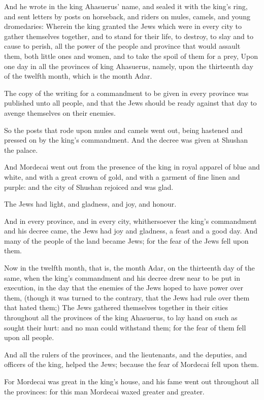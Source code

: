 \Verse And he wrote in the king Ahasuerus' name, and sealed it with the king's ring, and sent letters by posts on horseback, and riders on mules, camels, and young dromedaries: \Verse Wherein the king granted the Jews which were in every city to gather themselves together, and to stand for their life, to destroy, to slay and to cause to perish, all the power of the people and province that would assault them, both little ones and women, and to take the spoil of them for a prey, \Verse Upon one day in all the provinces of king Ahasuerus, namely, upon the thirteenth day of the twelfth month, which is the month Adar.

\Verse The copy of the writing for a commandment to be given in every province was published unto all people, and that the Jews should be ready against that day to avenge themselves on their enemies.

\Verse So the posts that rode upon mules and camels went out, being hastened and pressed on by the king's commandment. And the decree was given at Shushan the palace.

\Verse And Mordecai went out from the presence of the king in royal apparel of blue and white, and with a great crown of gold, and with a garment of fine linen and purple: and the city of Shushan rejoiced and was glad.

\Verse The Jews had light, and gladness, and joy, and honour.

\Verse And in every province, and in every city, whithersoever the king's commandment and his decree came, the Jews had joy and gladness, a feast and a good day. And many of the people of the land became Jews; for the fear of the Jews fell upon them.


\Chapter
\Verse Now in the twelfth month, that is, the month Adar, on the thirteenth day of the same, when the king's commandment and his decree drew near to be put in execution, in the day that the enemies of the Jews hoped to have power over them, (though it was turned to the contrary, that the Jews had rule over them that hated them;) \Verse The Jews gathered themselves together in their cities throughout all the provinces of the king Ahasuerus, to lay hand on such as sought their hurt: and no man could withstand them; for the fear of them fell upon all people.

\Verse And all the rulers of the provinces, and the lieutenants, and the deputies, and officers of the king, helped the Jews; because the fear of Mordecai fell upon them.

\Verse For Mordecai was great in the king's house, and his fame went out throughout all the provinces: for this man Mordecai waxed greater and greater.


